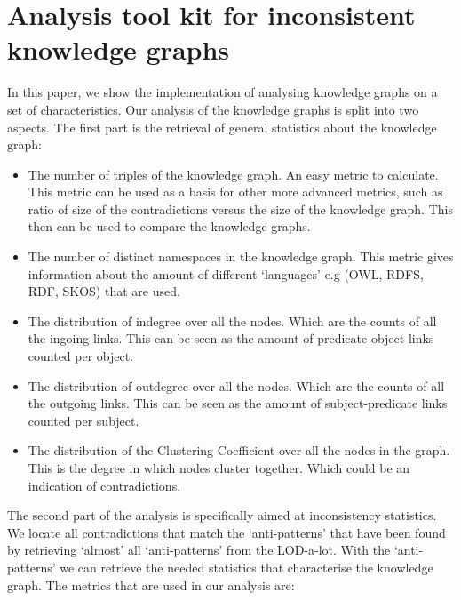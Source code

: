 \documentclass[11pt,letterpaper ,oneside ]{book}
\begin{document}
	\section{Analysis tool kit for inconsistent knowledge graphs}
	In this paper, we show the implementation of analysing knowledge graphs on a set of characteristics. Our analysis of the knowledge graphs is split into two aspects. The first part is the retrieval of general statistics about the knowledge graph:
	\begin{itemize}
		\item The number of triples of the knowledge graph. An easy metric to calculate. This metric can be used as a basis for other more advanced metrics, such as ratio of size of the contradictions versus the size of the knowledge graph. This then can be used to compare the knowledge graphs.
		\item The number of distinct namespaces in the knowledge graph. This metric gives information about the amount of different `languages' e.g (OWL, RDFS, RDF, SKOS) that are used. 
		\item The distribution of indegree over all the nodes. Which are the counts of all the ingoing links. This can be seen as the amount of predicate-object links counted per object.
		\item The distribution of outdegree over all the nodes. Which are the counts of all the outgoing links. This can be seen as the amount of subject-predicate links counted per subject.
		\item The distribution of the Clustering Coefficient over all the nodes in the graph. This is the degree in which nodes cluster together. Which could be an indication of contradictions.  
	\end{itemize}
	The second part of the analysis is specifically aimed at inconsistency statistics. We locate all contradictions that match the `anti-patterns' that have been found by retrieving `almost' all `anti-patterns' from the LOD-a-lot. With the `anti-patterns' we can retrieve the needed statistics that characterise the knowledge graph. The metrics that are used in our analysis are:
\end{document}
